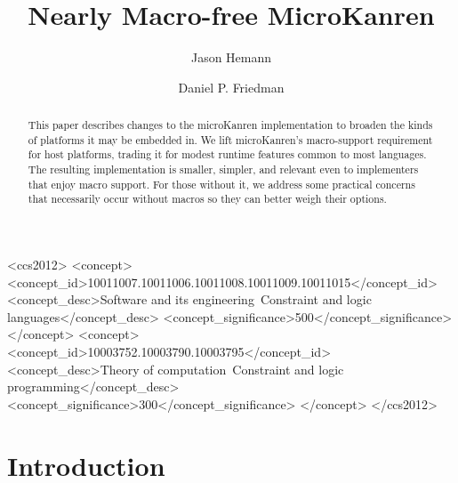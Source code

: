 \documentclass[sigplan,draft,balance,pbalance,natbib=false]{acmart}
\begin{document}
\title{Nearly Macro-free MicroKanren}

\author{Jason Hemann}
\author{Daniel P. Friedman}

\renewcommand{\shortauthors}{Hemann et al.}

\begin{abstract}

  This paper describes changes to the microKanren implementation to
  broaden the kinds of platforms it may be embedded in. We lift
  microKanren's macro-support requirement for host platforms, trading
  it for modest runtime features common to most languages. The
  resulting implementation is smaller, simpler, and relevant even to
  implementers that enjoy macro support. For those without it, we
  address some practical concerns that necessarily occur without
  macros so they can better weigh their options.

\end{abstract}

\begin{CCSXML}
<ccs2012>
   <concept>
       <concept_id>10011007.10011006.10011008.10011009.10011015</concept_id>
       <concept_desc>Software and its engineering~Constraint and logic languages</concept_desc>
       <concept_significance>500</concept_significance>
   </concept>
   <concept>
       <concept_id>10003752.10003790.10003795</concept_id>
       <concept_desc>Theory of computation~Constraint and logic programming</concept_desc>
       <concept_significance>300</concept_significance>
   </concept>
 </ccs2012>
\end{CCSXML}



\maketitle

\section{Introduction}
\end{document}

